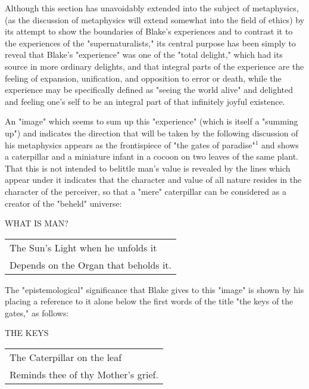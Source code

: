 Although this section has unavoidably extended into the subject of metaphysics, (as the discussion of metaphysics
will extend somewhat into the field of ethics) by its attempt to show the boundaries
of Blake's experiences and to contrast it to the experiences of the "supernaturalists," its central
purpose has been simply to reveal that Blake's "experience" was one of the "total delight,"
which had its source in more ordinary delights, and that integral parts of the experience are
the feeling of expansion, unification, and opposition to error or death, while the experience may be
specifically defined as "seeing the world alive" and delighted and feeling one's self to be an integral part
of that infinitely joyful existence.\par
\vspace*{0.5\baselineskip}
An "image" which seems to sum up this "experience" (which is itself a "summing up") and indicates the 
direction that will be taken by the following discussion of his metaphysics appears as the frontispiece of
"the gates of paradise"$^{1}$ and shows a caterpillar and a miniature infant in a cocoon on two leaves
of the same plant. That this is not intended to belittle man's value is revealed by the lines which 
appear under it indicates that the character and value of all nature resides in the character of the perceiver,
so that a "mere" caterpillar can be considered as a creator of the "beheld" universe:\par
\begin{center}
	\parbox{0.8\textwidth}{
		\centering
		WHAT IS MAN?\par
		\null\par
		\begin{tabular}{l}
			The Sun's Light when he unfolds it \\
			Depends on the Organ that beholds it.
		\end{tabular}
	}%
\end{center}
The "epistemological" significance that Blake gives to this "image" is shown by his placing
a reference to it alone below the first words of the title "the keys of the gates," as follows:\par
\begin{center}
	\parbox{0.8\textwidth}{
		\centering
		THE KEYS\par
		\null\par
		\begin{tabular}{l}
			The Caterpillar on the leaf \\
			Reminds thee of thy Mother's grief.
		\end{tabular}
	}%
\end{center}

